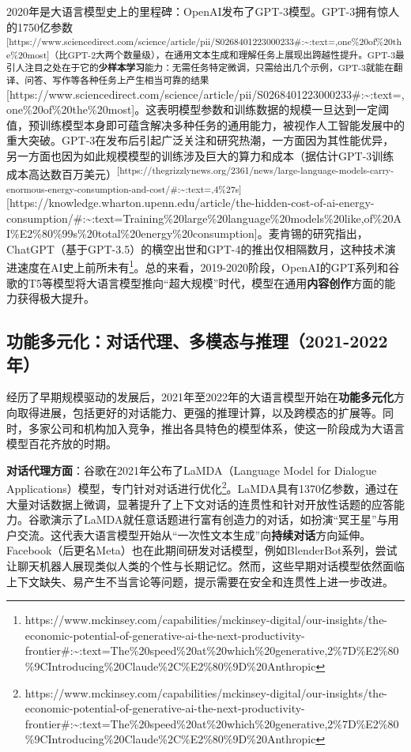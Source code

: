 \documentclass[
  letterpaper,
]{scrbook}
\begin{document}
2020年是大语言模型史上的里程碑：OpenAI发布了GPT-3模型。GPT-3拥有惊人的1750亿参数\textsuperscript{{[}https://www.sciencedirect.com/science/article/pii/S0268401223000233\#:\textasciitilde:text=,one\%20of\%20the\%20most{]}（比GPT-2大两个数量级），在通用文本生成和理解任务上展现出跨越性提升。GPT-3最引人注目之处在于它的\textbf{少样本学习}能力：无需任务特定微调，只需给出几个示例，GPT-3就能在翻译、问答、写作等各种任务上产生相当可靠的结果}{[}https://www.sciencedirect.com/science/article/pii/S0268401223000233\#:\textasciitilde:text=,one\%20of\%20the\%20most{]}。这表明模型参数和训练数据的规模一旦达到一定阈值，预训练模型本身即可蕴含解决多种任务的通用能力，被视作人工智能发展中的重大突破。GPT-3在发布后引起广泛关注和研究热潮，一方面因为其性能优异，另一方面也因为如此规模模型的训练涉及巨大的算力和成本（据估计GPT-3训练成本高达数百万美元）\textsuperscript{{[}https://thegrizzlynews.org/2361/news/large-language-models-carry-enormous-energy-consumption-and-cost/\#:\textasciitilde:text=,4\%27s{]}}{[}https://knowledge.wharton.upenn.edu/article/the-hidden-cost-of-ai-energy-consumption/\#:\textasciitilde:text=Training\%20large\%20language\%20models\%20like,of\%20AI\%E2\%80\%99s\%20total\%20energy\%20consumption{]}。麦肯锡的研究指出，ChatGPT（基于GPT-3.5）的横空出世和GPT-4的推出仅相隔数月，这种技术演进速度在AI史上前所未有\footnote{https://www.mckinsey.com/capabilities/mckinsey-digital/our-insights/the-economic-potential-of-generative-ai-the-next-productivity-frontier\#:\textasciitilde:text=The\%20speed\%20at\%20which\%20generative,2\%7D\%E2\%80\%9CIntroducing\%20Claude\%2C\%E2\%80\%9D\%20Anthropic}。总的来看，2019-2020阶段，OpenAI的GPT系列和谷歌的T5等模型将大语言模型推向``超大规模''时代，模型在通用\textbf{内容创作}方面的能力获得极大提升。

\subsection{功能多元化：对话代理、多模态与推理（2021-2022年）}\label{ux529fux80fdux591aux5143ux5316ux5bf9ux8bddux4ee3ux7406ux591aux6a21ux6001ux4e0eux63a8ux74062021-2022ux5e74}

经历了早期规模驱动的发展后，2021年至2022年的大语言模型开始在\textbf{功能多元化}方向取得进展，包括更好的对话能力、更强的推理计算，以及跨模态的扩展等。同时，多家公司和机构加入竞争，推出各具特色的模型体系，使这一阶段成为大语言模型百花齐放的时期。

\textbf{对话代理方面}：谷歌在2021年公布了LaMDA（Language Model for
Dialogue
Applications）模型，专门针对对话进行优化\footnote{https://www.mckinsey.com/capabilities/mckinsey-digital/our-insights/the-economic-potential-of-generative-ai-the-next-productivity-frontier\#:\textasciitilde:text=The\%20speed\%20at\%20which\%20generative,2\%7D\%E2\%80\%9CIntroducing\%20Claude\%2C\%E2\%80\%9D\%20Anthropic}。LaMDA具有1370亿参数，通过在大量对话数据上微调，显著提升了上下文对话的连贯性和针对开放性话题的应答能力。谷歌演示了LaMDA就任意话题进行富有创造力的对话，如扮演``冥王星''与用户交流。这代表大语言模型开始从``一次性文本生成''向\textbf{持续对话}方向延伸。Facebook（后更名Meta）也在此期间研发对话模型，例如BlenderBot系列，尝试让聊天机器人展现类似人类的个性与长期记忆。然而，这些早期对话模型依然面临上下文缺失、易产生不当言论等问题，提示需要在安全和连贯性上进一步改进。
\end{document}

